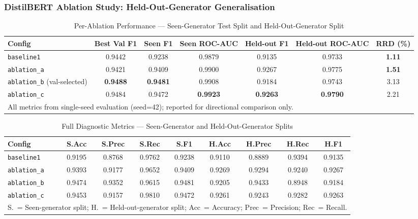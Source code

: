 \documentclass[conference]{IEEEtran}
\begin{document}
\subsubsection{DistilBERT Ablation Study: Held-Out-Generator Generalisation}

\begin{table}[t]
\caption{Per-Ablation Performance --- Seen-Generator Test Split and Held-Out-Generator Split}
\label{tab:ablation}
\begin{center}
\footnotesize
\begin{tabular}{lcccccc}
\toprule
\textbf{Config} & \textbf{Best Val F1} & \textbf{Seen F1} & \textbf{Seen ROC-AUC} & \textbf{Held-out F1} & \textbf{Held-out ROC-AUC} & \textbf{RRD (\%)}\\
\midrule
\texttt{baseline1}               & 0.9442 & 0.9238 & 0.9879 & 0.9135 & 0.9733 & \textbf{1.11}\\
\texttt{ablation\_a}             & 0.9421 & 0.9409 & 0.9900 & 0.9267 & 0.9775 & \textbf{1.51}\\
\texttt{ablation\_b} (val-selected)  & \textbf{0.9488} & \textbf{0.9481} & 0.9908 & 0.9184 & 0.9743 & 3.13\\
\texttt{ablation\_c}             & 0.9484 & 0.9472 & \textbf{0.9923} & \textbf{0.9263} & \textbf{0.9790} & 2.21\\
\bottomrule
\multicolumn{7}{l}{\footnotesize All metrics from single-seed evaluation (seed=42); reported for directional comparison only.}\\
\end{tabular}
\end{center}
\end{table}

\begin{table}[t]
\caption{Full Diagnostic Metrics --- Seen-Generator and Held-Out-Generator Splits}
\label{tab:diagnostic}
\begin{center}
\footnotesize
\begin{tabular}{lcccccccc}
\toprule
\textbf{Config} & \textbf{S.Acc} & \textbf{S.Prec} & \textbf{S.Rec} & \textbf{S.F1} & \textbf{H.Acc} & \textbf{H.Prec} & \textbf{H.Rec} & \textbf{H.F1}\\
\midrule
\texttt{baseline1}  & 0.9195 & 0.8768 & 0.9762 & 0.9238 & 0.9110 & 0.8889 & 0.9394 & 0.9135\\
\texttt{ablation\_a}& 0.9393 & 0.9177 & 0.9652 & 0.9409 & 0.9269 & 0.9294 & 0.9240 & 0.9267\\
\texttt{ablation\_b}& 0.9474 & 0.9352 & 0.9615 & 0.9481 & 0.9205 & 0.9433 & 0.8948 & 0.9184\\
\texttt{ablation\_c}& 0.9453 & 0.9157 & 0.9810 & 0.9472 & 0.9261 & 0.9243 & 0.9282 & 0.9263\\
\bottomrule
\multicolumn{9}{l}{\footnotesize S.~= Seen-generator split; H.~= Held-out-generator split; Acc~= Accuracy; Prec~= Precision; Rec~= Recall.}
\end{tabular}
\end{center}
\end{table}
\end{document}
